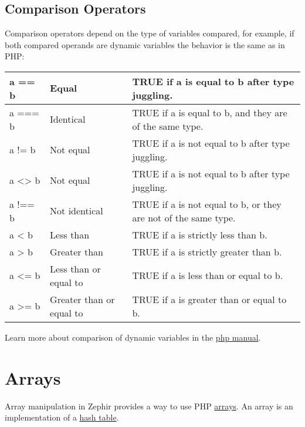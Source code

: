 \documentclass[letterpaper,10pt,english]{sphinxmanual}
\begin{document}
\subsection{Comparison Operators}
\label{operators:comparison-operators}
Comparison operators depend on the type of variables compared, for example, if both
compared operands are dynamic variables the behavior is the same as in PHP:

\begin{tabulary}{\linewidth}{|L|L|L|}
\hline

a == b
 & 
Equal
 & 
TRUE if a is equal to b after type juggling.
\\\hline

a === b
 & 
Identical
 & 
TRUE if a is equal to b, and they are of the same type.
\\\hline

a != b
 & 
Not equal
 & 
TRUE if a is not equal to b after type juggling.
\\\hline

a \textless{}\textgreater{} b
 & 
Not equal
 & 
TRUE if a is not equal to b after type juggling.
\\\hline

a !== b
 & 
Not identical
 & 
TRUE if a is not equal to b, or they are not of the same type.
\\\hline

a \textless{} b
 & 
Less than
 & 
TRUE if a is strictly less than b.
\\\hline

a \textgreater{} b
 & 
Greater than
 & 
TRUE if a is strictly greater than b.
\\\hline

a \textless{}= b
 & 
Less than or equal to
 & 
TRUE if a is less than or equal to b.
\\\hline

a \textgreater{}= b
 & 
Greater than or equal to
 & 
TRUE if a is greater than or equal to b.
\\\hline
\end{tabulary}


Learn more about comparison of dynamic variables in the \href{http://www.php.net/manual/en/language.operators.comparison.php}{php manual}.


\section{Arrays}
\label{arrays:arrays}\label{arrays:php-manual}\label{arrays::doc}
Array manipulation in Zephir provides a way to use PHP \href{http://www.php.net/manual/en/language.types.array.php}{arrays}.
An array is an implementation of a \href{http://en.wikipedia.org/wiki/Hash\_table}{hash table}.
\end{document}
